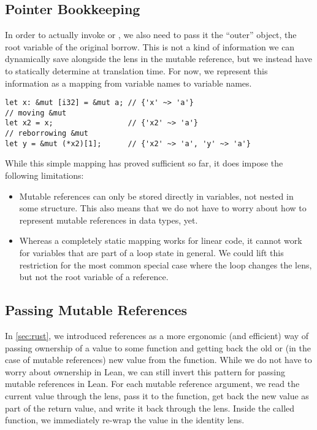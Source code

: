 \subsection{Pointer Bookkeeping}

In order to actually invoke  or , we also need to
pass it the ``outer'' object, \ie the root variable of the original borrow. This
is not a kind of information we can dynamically save alongside the lens in the
mutable reference, but we instead have to statically determine at translation
time. For now, we represent this information as a mapping from variable names to
variable names.

\begin{verbatim}
let x: &mut [i32] = &mut a; // {'x' ~> 'a'}
// moving &mut
let x2 = x;                 // {'x2' ~> 'a'}
// reborrowing &mut
let y = &mut (*x2)[1];      // {'x2' ~> 'a', 'y' ~> 'a'}
\end{verbatim}

While this simple mapping has proved sufficient so far, it does impose
the following limitations:

\begin{itemize}
\item Mutable references can only be stored directly in variables, not nested in
  some structure. This also means that we do not have to worry about how to
  represent mutable references in data types, yet.
\item Whereas a completely static mapping works for linear code, it cannot work
  for variables that are part of a loop state in general. We could lift this
  restriction for the most common special case where the loop changes the lens,
  but not the root variable of a reference.
\end{itemize}

\subsection{Passing Mutable References}

In \autoref{sec:rust}, we introduced references as a more ergonomic (and
efficient) way of passing ownership of a value to some function and getting back the
old or (in the case of mutable references) new value from the function. While we
do not have to worry about ownership in Lean, we can still invert this pattern
for passing mutable references in Lean. For each mutable reference argument, we
read the current value through the lens, pass it to the function, get back the new
value as part of the return value, and write it back through the lens. Inside
the called function, we immediately re-wrap the value in the identity lens.

